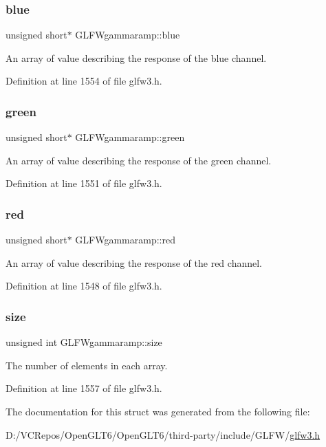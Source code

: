 \subsubsection{\texorpdfstring{blue}{blue}}
{\footnotesize\ttfamily unsigned short$\ast$ G\+L\+F\+Wgammaramp\+::blue}

An array of value describing the response of the blue channel. 

Definition at line 1554 of file glfw3.\+h.

\mbox{\label{struct_g_l_f_wgammaramp_affccc6f5df47820b6562d709da3a5a3a}} 
\subsubsection{\texorpdfstring{green}{green}}
{\footnotesize\ttfamily unsigned short$\ast$ G\+L\+F\+Wgammaramp\+::green}

An array of value describing the response of the green channel. 

Definition at line 1551 of file glfw3.\+h.

\mbox{\label{struct_g_l_f_wgammaramp_a2cce5d968734b685623eef913e635138}} 
\subsubsection{\texorpdfstring{red}{red}}
{\footnotesize\ttfamily unsigned short$\ast$ G\+L\+F\+Wgammaramp\+::red}

An array of value describing the response of the red channel. 

Definition at line 1548 of file glfw3.\+h.

\mbox{\label{struct_g_l_f_wgammaramp_ad620e1cffbff9a32c51bca46301b59a5}} 
\subsubsection{\texorpdfstring{size}{size}}
{\footnotesize\ttfamily unsigned int G\+L\+F\+Wgammaramp\+::size}

The number of elements in each array. 

Definition at line 1557 of file glfw3.\+h.



The documentation for this struct was generated from the following file\+:\begin{DoxyCompactItemize}
\item 
D\+:/\+V\+C\+Repos/\+Open\+G\+L\+T6/\+Open\+G\+L\+T6/third-\/party/include/\+G\+L\+F\+W/\mbox{\hyperlink{glfw3_8h}{glfw3.\+h}}\end{DoxyCompactItemize}
